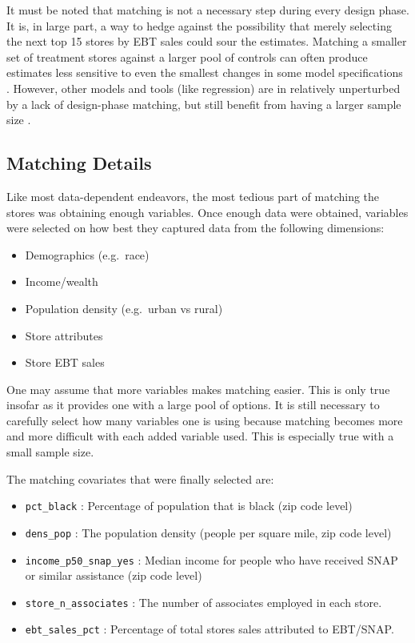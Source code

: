 \documentclass[12pt,letterpaperpaper,]{book}
\providecommand{\tightlist}{%
  \setlength{\itemsep}{0pt}\setlength{\parskip}{0pt}}
\begin{document}
It must be noted that matching is not a necessary step during every
design phase. It is, in large part, a way to hedge against the
possibility that merely selecting the next top 15 stores by EBT sales
could sour the estimates. Matching a smaller set of treatment stores
against a larger pool of controls can often produce estimates less
sensitive to even the smallest changes in some model specifications
\citep{imbens_causal_2015}. However, other models and tools (like
regression) are in relatively unperturbed by a lack of design-phase
matching, but still benefit from having a larger sample size
\citep{angrist_mostly_2008}.

\subsection*{Matching Details}\label{matching-details}

Like most data-dependent endeavors, the most tedious part of matching
the stores was obtaining enough variables. Once enough data were
obtained, variables were selected on how best they captured data from
the following dimensions:

\begin{itemize}
\tightlist
\item
  Demographics (e.g.~race)
\item
  Income/wealth
\item
  Population density (e.g.~urban vs rural)
\item
  Store attributes
\item
  Store EBT sales
\end{itemize}

One may assume that more variables makes matching easier. This is only
true insofar as it provides one with a large pool of options. It is
still necessary to carefully select how many variables one is using
because matching becomes more and more difficult with each added
variable used. This is especially true with a small sample size.

The matching covariates that were finally selected are:

\begin{itemize}
\tightlist
\item
  \texttt{pct\_black} : Percentage of population that is black (zip code
  level)
\item
  \texttt{dens\_pop} : The population density (people per square mile,
  zip code level)
\item
  \texttt{income\_p50\_snap\_yes} : Median income for people who have
  received SNAP or similar assistance (zip code level)
\item
  \texttt{store\_n\_associates} : The number of associates employed in
  each store.
\item
  \texttt{ebt\_sales\_pct} : Percentage of total stores sales attributed
  to EBT/SNAP.
\end{itemize}
\end{document}
